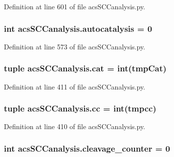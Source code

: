 Definition at line 601 of file acs\-S\-C\-Canalysis.\-py.

\hypertarget{a00102_a70ccd5d519e878c6c8a7d0aa73caf46c}{
\subsubsection[{autocatalysis}]{\setlength{\rightskip}{0pt plus 5cm}int acs\-S\-C\-Canalysis.\-autocatalysis = 0}}\label{a00102_a70ccd5d519e878c6c8a7d0aa73caf46c}


Definition at line 573 of file acs\-S\-C\-Canalysis.\-py.

\hypertarget{a00102_aea872e34fe0da6302f6195f1b2315148}{
\subsubsection[{cat}]{\setlength{\rightskip}{0pt plus 5cm}tuple acs\-S\-C\-Canalysis.\-cat = int(tmp\-Cat)}}\label{a00102_aea872e34fe0da6302f6195f1b2315148}


Definition at line 411 of file acs\-S\-C\-Canalysis.\-py.

\hypertarget{a00102_a67fcb77a15f51e94c98bb48b05865715}{
\subsubsection[{cc}]{\setlength{\rightskip}{0pt plus 5cm}tuple acs\-S\-C\-Canalysis.\-cc = int(tmpcc)}}\label{a00102_a67fcb77a15f51e94c98bb48b05865715}


Definition at line 410 of file acs\-S\-C\-Canalysis.\-py.

\hypertarget{a00102_a0dd6730b063ac11ae4620c4a0778f6d9}{
\subsubsection[{cleavage\-\_\-counter}]{\setlength{\rightskip}{0pt plus 5cm}int acs\-S\-C\-Canalysis.\-cleavage\-\_\-counter = 0}}\label{a00102_a0dd6730b063ac11ae4620c4a0778f6d9}



